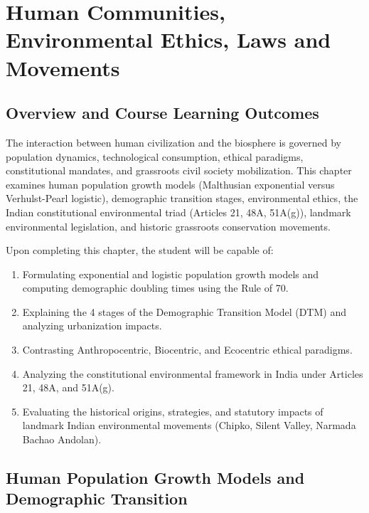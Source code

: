\chapter{Human Communities, Environmental Ethics, Laws and Movements}
\label{chap:human-communities-laws}

\section{Overview and Course Learning Outcomes}
The interaction between human civilization and the biosphere is governed by population dynamics, technological consumption, ethical paradigms, constitutional mandates, and grassroots civil society mobilization. This chapter examines human population growth models (Malthusian exponential versus Verhulst-Pearl logistic), demographic transition stages, environmental ethics, the Indian constitutional environmental triad (Articles 21, 48A, 51A(g)), landmark environmental legislation, and historic grassroots conservation movements.

\begin{important}
Upon completing this chapter, the student will be capable of:
\begin{enumerate}[leftmargin=1.5em]
    \item Formulating exponential and logistic population growth models and computing demographic doubling times using the Rule of 70.
    \item Explaining the 4 stages of the Demographic Transition Model (DTM) and analyzing urbanization impacts.
    \item Contrasting Anthropocentric, Biocentric, and Ecocentric ethical paradigms.
    \item Analyzing the constitutional environmental framework in India under Articles 21, 48A, and 51A(g).
    \item Evaluating the historical origins, strategies, and statutory impacts of landmark Indian environmental movements (Chipko, Silent Valley, Narmada Bachao Andolan).
\end{enumerate}
\end{important}

\section{Human Population Growth Models and Demographic Transition}
